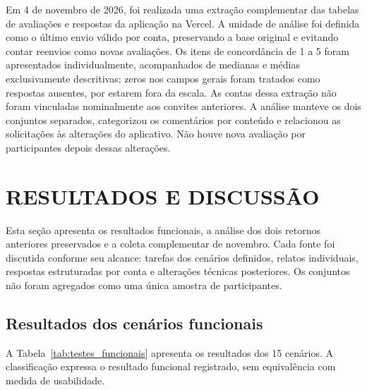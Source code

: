 \documentclass{UNESC}
\begin{document}
Em 4 de novembro de 2026, foi realizada uma extração complementar das tabelas de avaliações e respostas da aplicação na Vercel. A unidade de análise foi definida como o último envio válido por conta, preservando a base original e evitando contar reenvios como novas avaliações. Os itens de concordância de 1 a 5 foram apresentados individualmente, acompanhados de medianas e médias exclusivamente descritivas; zeros nos campos gerais foram tratados como respostas ausentes, por estarem fora da escala. As contas dessa extração não foram vinculadas nominalmente aos convites anteriores. A análise manteve os dois conjuntos separados, categorizou os comentários por conteúdo e relacionou as solicitações às alterações do aplicativo. Não houve nova avaliação por participantes depois dessas alterações.

\section{RESULTADOS E DISCUSSÃO}

Esta seção apresenta os resultados funcionais, a análise dos dois retornos anteriores preservados e a coleta complementar de novembro. Cada fonte foi discutida conforme seu alcance: tarefas dos cenários definidos, relatos individuais, respostas estruturadas por conta e alterações técnicas posteriores. Os conjuntos não foram agregados como uma única amostra de participantes.

\subsection{Resultados dos cenários funcionais}

A Tabela~\ref{tab:testes_funcionais} apresenta os resultados dos 15 cenários. A classificação expressa o resultado funcional registrado, sem equivalência com medida de usabilidade.
\end{document}
